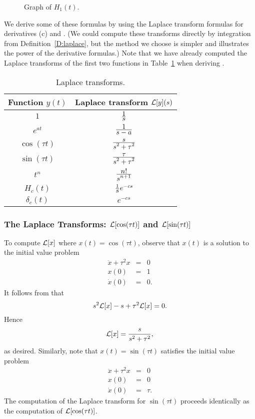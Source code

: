 \documentclass{ximera}
\begin{document}
\begin{figure}[htb]
           \centerline{%
           }
           \caption{Graph of $H_1(t)$.}
           \label{F:H1}
\end{figure}

We derive some of these formulas by using the Laplace transform formulas for 
derivatives (c) and .  (We could compute these 
transforms directly by integration from Definition~\ref{D:laplace}, but the 
method we choose is simpler and illustrates the power of the derivative 
formulas.)  Note that we have already computed the Laplace transforms 
of the first two functions in Table~\ref{tab:Laplist} when deriving 
.

\begin{table}[htb]
\begin{center}
\begin{tabular}{|c|c|}
\hline
Function $y(t)$ & Laplace transform ${\cal L}[y](s)$\\
\hline
$1$ & $\frac{\displaystyle 1}{\displaystyle s}$\\
$e^{at}$ & $\frac{\displaystyle 1}{\displaystyle s-a}$\\
$\cos(\tau t)$ & $\frac{\displaystyle s}{\displaystyle s^2 + \tau^2}$\\
$\sin(\tau t)$ & $\frac{\displaystyle \tau}{\displaystyle s^2 + \tau^2}$\\
$t^n$ & $\frac{\displaystyle n!}{\displaystyle s^{n+1}}$\\
$H_c(t)$ & $\frac{1}{\displaystyle s}e^{-cs}$\\
$\delta_c(t)$ & $e^{-cs}$\\
\hline
\end{tabular}
\end{center}
\caption{Laplace transforms.}
\label{tab:Laplist}
\end{table}


\subsubsection*{The Laplace Transforms: ${\cal L}[\cos(\tau t)]$ and 
${\cal L}[\sin(\tau t)]$}

To compute ${\cal L}[x]$ where $x(t)=\cos(\tau t)$, observe that $x(t)$ is 
a solution to the initial value problem
\begin{eqnarray*}
\ddot{x}+\tau^2 x & = & 0\\ 
x(0) & = & 1 \\ 
\dot{x}(0) & = & 0.
\end{eqnarray*}
It follows from  that
\[
s^2{\cal L}[x] - s + \tau^2 {\cal L}[x] = 0.
\]
Hence
\[
{\cal L}[x] = \frac{s}{s^2+\tau^2},
\]
as desired.  Similarly, note that $x(t)=\sin(\tau t)$ satisfies the initial
value problem
\begin{eqnarray*}
\ddot{x}+\tau^2 x & = & 0 \\
  x(0) & = & 0 \\
 \dot{x}(0) & = & \tau.
\end{eqnarray*}
The computation of the Laplace transform for $\sin(\tau t)$ proceeds
identically as the computation of ${\cal L}[\cos(\tau t)]$.
\end{document}
